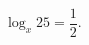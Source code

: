 \begin{ex}[type=equation]
	\begin{condition}
		$\log_x 25 = \dfrac{1}{2}.$
	\end{condition}
\end{ex}